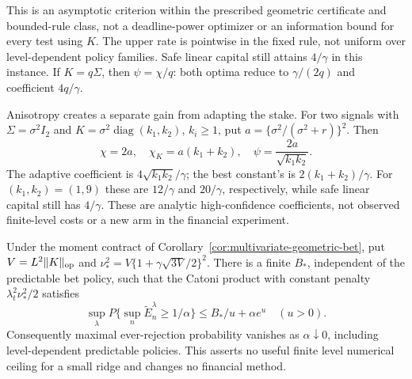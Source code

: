 This is an asymptotic criterion within the prescribed geometric certificate
and bounded-rule class, not a deadline-power optimizer or an information bound
for every test using $K$. The upper rate is pointwise in the fixed rule, not
uniform over level-dependent policy families. Safe linear capital still attains
$4/\gamma$ in this instance. If $K=q\Sigma$, then $\psi=\chi/q$: both optima
reduce to $\gamma/(2q)$ and coefficient $4q/\gamma$.

Anisotropy creates a separate gain from adapting the stake. For two signals
with $\Sigma=\sigma^2 I_2$ and $K=\sigma^2\operatorname{diag}(k_1,k_2)$,
$k_i\ge1$, put $a=\{\sigma^2/(\sigma^2+r)\}^2$. Then
\[
 \chi=2a,\quad \chi_K=a(k_1+k_2),\quad
 \psi=\frac{2a}{\sqrt{k_1k_2}}.
\]
The adaptive coefficient is $4\sqrt{k_1k_2}/\gamma$; the best constant's is
$2(k_1+k_2)/\gamma$. For $(k_1,k_2)=(1,9)$ these are $12/\gamma$ and
$20/\gamma$, respectively, while safe linear capital still has $4/\gamma$.
These are analytic high-confidence coefficients, not observed finite-level
costs or a new arm in the financial experiment.

\begin{corollary}
\label{cor:multivariate-constant-certificate}
Under the moment contract of Corollary~\ref{cor:multivariate-geometric-bet},
put $V=L^2\lVert K\rVert_{\mathrm{op}}$ and
$\nu_*^2=V\{1+\gamma\sqrt{3V}/2\}^2$. There is a finite $B_*$, independent
of the predictable bet policy, such that the Catoni product with constant
penalty $\lambda_t^2\nu_*^2/2$ satisfies
\[
 \sup_\lambda P\{\sup_n\widetilde E_n^\lambda\ge1/\alpha\}
       \le B_*/u+\alpha e^u\quad(u>0).
\]
Consequently maximal ever-rejection probability vanishes as $\alpha\downarrow0$,
including level-dependent predictable policies. This asserts no useful finite
level numerical ceiling for a small ridge and changes no financial method.
\end{corollary}
